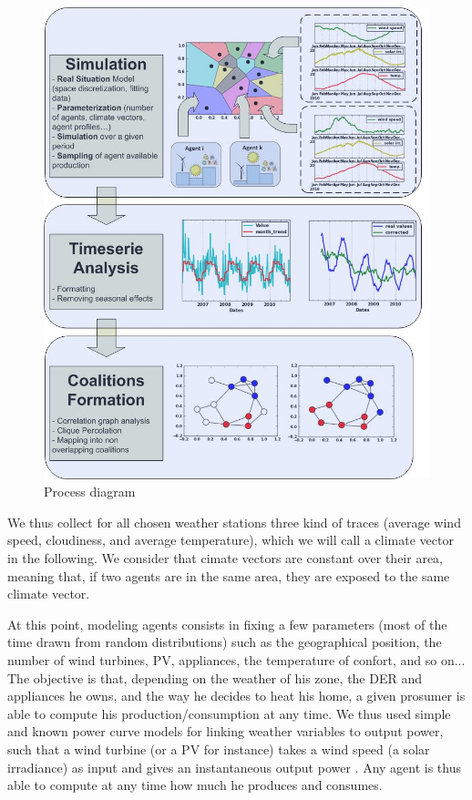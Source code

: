 \documentclass[conference]{IEEEtran}
\begin{document}
\begin{center}
\begin{figure}
\includegraphics[scale=0.45]{figure2.jpg}
\caption{Process diagram}
\label{Fig1}
\end{figure}
\end{center}

We thus collect for all chosen weather stations three kind of traces (average wind speed, cloudiness, and average temperature), which we will call a climate vector in the following. We consider that cimate vectors are constant over their area, meaning that, if two agents are in the same area, they are exposed to the same climate vector.

At this point, modeling agents consists in fixing a few parameters (most of the time drawn from random distributions) such as the geographical position, the number of wind turbines, PV, appliances, the temperature of confort, and so on... The objective is that, depending on the weather of his zone, the DER and appliances he owns, and the way he decides to heat his home, a given prosumer is able to compute his production/consumption at any time. We thus used simple and known power curve models for linking weather variables to output power, such that a wind turbine (or a PV for instance) takes a wind speed (a solar irradiance) as input and gives an instantaneous output power \cite{Kota2011} \cite{windturbinemodel}. Any agent is thus able to compute at any time how much he produces and consumes. 
\end{document}
